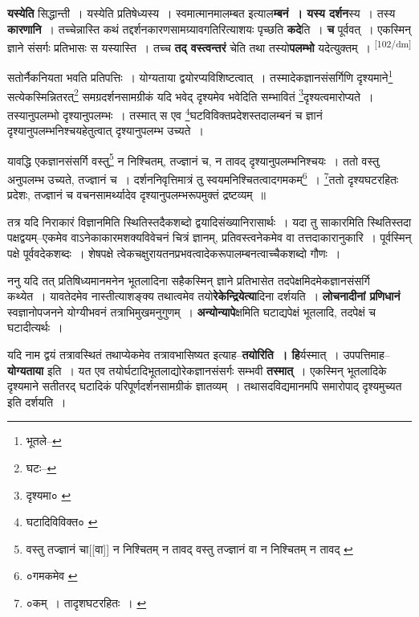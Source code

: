 \documentclass[article,12pt,a4paper]{memoir}
\begin{document}
	  \pstart \textbf{यस्येति} सिद्धान्ती । यस्येति प्रतिषेध्यस्य । स्वमात्मानमालम्बत इत्याल\textbf{म्बनं । यस्य दर्शन}स्य । तस्य \textbf{कारणानि} । तच्चेन्नास्ति कथं तद्दर्शनकारणसामग्र्यावगतिरित्याशयः पृच्छति \textbf{कदे}ति । \textbf{च} पूर्ववत् । एकस्मिन् ज्ञाने संसर्गः प्रतिभासः स यस्यास्ति । तच्च \textbf{तद् वस्त्वन्तरं} चेति तथा तस्यो\textbf{पलम्भो} यदेत्युक्तम् ।
	\pend
      \leavevmode\textsuperscript{\rmlatinfont\tiny [102/dm]}

	  \pstart सतोर्नैकनियता भवति प्रतिपत्तिः । योग्यताया द्वयोरप्यविशिष्टत्वात् । तस्मादेकज्ञानसंसर्गिणि दृश्यमाने\footnote{भूतले--\cite{dp-msD-n}} सत्येकस्मिन्नितरत्\footnote{घटः--\cite{dp-msD-n}} समग्रदर्शनसामग्रीकं यदि भवेद् दृश्यमेव भवेदिति सम्भावितं \footnote{दृश्यमा० \cite{dp-msA} \cite{dp-edP} \cite{dp-edH} \cite{dp-edE} \cite{dp-edN}}दृश्यत्वमारोप्यते । तस्यानुपलम्भो दृश्यानुपलम्भः । तस्मात् स एव \footnote{घटादिविविक्त० \cite{dp-msB}}घटविविक्तप्रदेशस्तदालम्बनं च ज्ञानं दृश्यानुपलम्भनिश्चयहेतुत्वात् दृश्यानुपलम्भ उच्यते ।
	\pend
       

	  \pstart यावद्धि एकज्ञानसंसर्गि वस्तु\footnote{वस्तु तज्ज्ञानं चा[[वा]] न निश्चितम् न तावद् \cite{dp-msB} वस्तु तज्ज्ञानं वा न निश्चितम् न तावद् \cite{dp-msD}} न निश्चितम्, तज्ज्ञानं च, न तावद् दृश्यानुपलम्भनिश्चयः । ततो वस्तु अनुपलम्भ उच्यते, तज्ज्ञानं च । दर्शननिवृत्तिमात्रं तु स्वयमनिश्चितत्वादगमकम्\footnote{०गमकमेव \cite{dp-msC}} । \footnote{०कम् । तादृशघटरहितः । \cite{dp-msB}}ततो दृश्यघटरहितः प्रदेशः, तज्ज्ञानं च वचनसामर्थ्यादेव दृश्यानुपलम्भरूपमुक्तं द्रष्टव्यम् ॥
	\pend
      

	  \pstart तत्र यदि निराकारं विज्ञानमिति स्थितिस्तदैकशब्दो द्वयादिसंख्यानिरासार्थः । यदा तु साकारमिति स्थितिस्तदा पक्षद्वयम्--एकमेव वाऽनेकाकारमशक्यविवेचनं चित्रं ज्ञानम्, प्रतिवस्त्वनेकमेव वा तत्तदाकारानुकारि । पूर्वस्मिन् पक्षे पूर्ववदेकशब्दः । शेषपक्षे त्वेकचक्षुरायतनप्रभवत्वादेकरूपालम्बनत्वाच्चैकशब्दो गौणः ।
	\pend
      

	  \pstart ननु यदि तत् प्रतिषिध्यमानमनेन भूतलादिना सहैकस्मिन् ज्ञाने प्रतिभासेत तदपेक्षमिदमेकज्ञानसंसर्गि कथ्येत । यावतेदमेव नास्तीत्याशङ्क्य तथात्वमेव तयो\textbf{रेकेन्द्रियेत्या}दिना दर्शयति । \textbf{लोचनादीनां प्रणिधानं} स्वज्ञानोपजनने योग्यीभवनं तत्राभिमुखमनुगुणम् । \textbf{अन्योन्यापे}क्षमिति घटाद्यपेक्षं भूतलादि, तदपेक्षं च घटादीत्यर्थः ।
	\pend
      

	  \pstart यदि नाम द्वयं तत्रावस्थितं तथाप्येकमेव तत्रावभासिष्यत इत्याह--\textbf{तयोरिति । हि}र्यस्मात् । उपपत्तिमाह--\textbf{योग्यताया} इति । यत एव तयोर्घटादिभूतलाद्योरेकज्ञानसंसर्गः सम्भवी \textbf{तस्मात्} । एकस्मिन् भूतलादिके दृश्यमाने सतीतरद् घटादिकं परिपूर्णदर्शनसामग्रीकं ज्ञातव्यम् । तथासदविद्यमानमपि समारोपाद् दृश्यमुच्यत इति दर्शयति ।
	\pend
      
\end{document}
